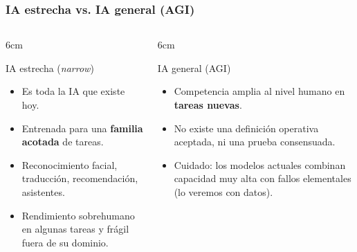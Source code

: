 \documentclass[aspectratio=169, 10pt]{beamer}
\begin{document}
\begin{frame}
\frametitle{IA estrecha vs. IA general (AGI)}
\begin{columns}[T]
\begin{column}{6cm}
\begin{block}{IA estrecha (\emph{narrow})}
\begin{itemize}
	\item Es toda la IA que existe hoy.
	\item Entrenada para una \textbf{familia acotada} de tareas.
	\item Reconocimiento facial, traducci\'on, recomendaci\'on, asistentes.
	\item Rendimiento sobrehumano en algunas tareas y fr\'agil fuera de su dominio.
\end{itemize}
\end{block}
\end{column}
\begin{column}{6cm}
\begin{alertblock}{IA general (AGI)}
\begin{itemize}
	\item Competencia amplia al nivel humano en \textbf{tareas nuevas}.
	\item No existe una definici\'on operativa aceptada, ni una prueba consensuada.
	\item Cuidado: los modelos actuales combinan capacidad muy alta con fallos elementales (lo veremos con datos).
\end{itemize}
\end{alertblock}
\end{column}
\end{columns}
\vspace{0.4em}
\begin{center}
\end{center}
\end{frame}
\end{document}
